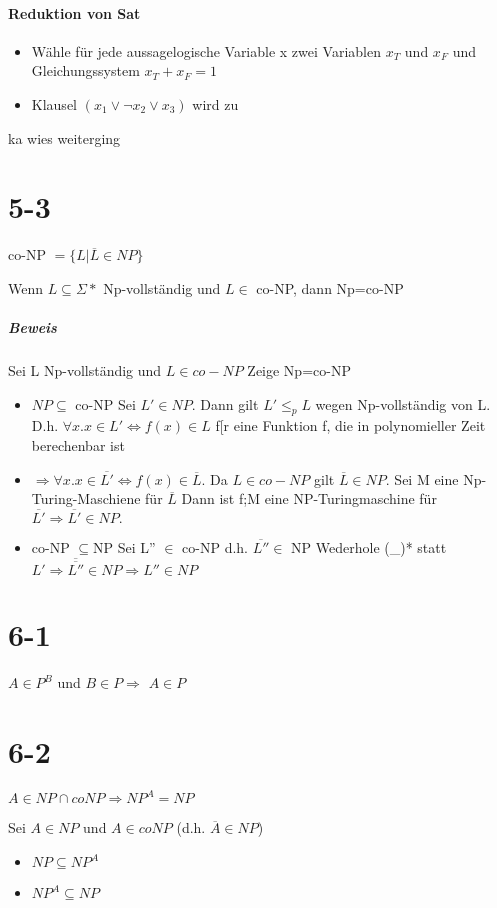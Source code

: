 \documentclass[12pt, oneside, a4paper, numbers=enddot, abstracton, parskip=full]{scrreprt}
\begin{document}
\paragraph{Reduktion von Sat}
\begin{itemize}
\item Wähle für jede aussagelogische Variable x zwei Variablen $x_T$ und $x_F$ und Gleichungssystem
  $x_T + x_F = 1$
\item Klausel $(x_1 \vee \neg x_2 \vee x_3)$ wird zu 
\end{itemize}
ka wies weiterging
\section{5-3}
co-NP $=\{ L | \overline{L} \in NP \}$

Wenn $L\subseteq \Sigma*$ Np-vollständig und $L\in$ co-NP, dann Np=co-NP

\subparagraph{Beweis}
Sei L Np-vollständig und $L\in co-NP$  Zeige Np=co-NP
\begin{itemize}
\item $NP\subseteq$ co-NP
  Sei $L' \in NP$. Dann gilt $L'\leq_p L$ wegen Np-vollständig von L. D.h.
  $\forall x. x\in L' \Leftrightarrow f(x) \in L$ f[r eine Funktion f, die in polynomieller Zeit
    berechenbar ist
  \item $\Rightarrow \forall x. x\in \overline{L'} \Leftrightarrow f(x) \in \overline{L}$.
    Da $L\in co-NP$ gilt $\overline{L} \in NP.$ Sei M eine Np-Turing-Maschiene für $\overline{L}$ Dann ist f;M eine NP-Turingmaschine für $\overline{L'} \Rightarrow \overline{L'} \in NP.$
  \item co-NP $\subseteq$NP Sei L'' $\in$ co-NP d.h. $\overline{L''} \in$ NP
    Wederhole (\_)* statt $L'\Rightarrow \overline{\overline{L''}} \in NP \Rightarrow L'' \in NP$
\end{itemize}

\section{6-1}
$A \in P^B$ und $B \in P \Rightarrow$ $A \in P$

\section{6-2}
$A \in NP \cap coNP \Rightarrow NP^A = NP$

Sei $A\in NP$ und $A\in coNP$ (d.h. $\overline{A} \in NP$)
\begin{itemize}
\item $NP \subseteq NP^A$
\item $NP^A \subseteq NP$
\end{itemize}
\end{document}
